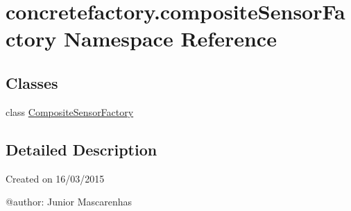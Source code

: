 \hypertarget{namespaceconcretefactory_1_1compositeSensorFactory}{}\section{concretefactory.\+composite\+Sensor\+Factory Namespace Reference}
\label{namespaceconcretefactory_1_1compositeSensorFactory}
\subsection*{Classes}
\begin{DoxyCompactItemize}
\item 
class \hyperlink{classconcretefactory_1_1compositeSensorFactory_1_1CompositeSensorFactory}{Composite\+Sensor\+Factory}
\end{DoxyCompactItemize}


\subsection{Detailed Description}
\begin{DoxyVerb}Created on 16/03/2015

@author: Junior Mascarenhas
\end{DoxyVerb}
 